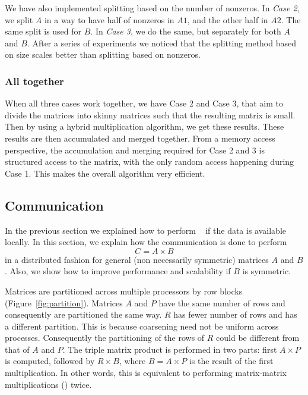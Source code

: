 We have also implemented splitting based on the number of nonzeros. In \textit{Case 2}, we split $A$ in a way to have half of nonzeros in $A1$, and the other half in $A2$. The same split is used for $B$. In \textit{Case 3}, we do the same, but separately for both $A$ and $B$. After a series of experiments we noticed that the splitting method based on size scales better than splitting based on nonzeros.

\subsubsection{All together}

When all three cases work together, we have Case 2 and Case 3, that aim to divide the matrices into skinny matrices such that the resulting matrix is small. Then by using a hybrid multiplication algorithm, we get these results. These results are then accumulated and merged together. From a memory access perspective, the accumulation and merging required for Case 2 and 3 is structured access to the matrix, with the only random access happening during Case 1. This makes the overall algorithm very efficient. 

\subsection{Communication}
\label{sec:amg}

In the previous section we explained how to perform \mm~ if the data is available locally. In this section, we explain how the communication is done to perform
\begin{equation}
    C = A \times B
\end{equation}
in a distributed fashion for general (non necessarily symmetric) matrices $A$ and $B$. Also, we show how to improve performance and scalability if $B$ is symmetric.

Matrices are partitioned across multiple processors by row blocks (Figure~\ref{fig:partition}). Matrices $A$ and $P$ have the same number of rows and consequently are partitioned the same way. $R$ has fewer number of rows and has a different partition. This is because coarsening need not be uniform across processes. Consequently the partitioning of the rows of $R$ could be different from that of $A$ and $P$. The triple matrix product is performed in two parts: first $A \times P$ is computed, followed by $R \times B$, where $B = A \times P$ is the result of the first multiplication. In other words, this is equivalent to performing matrix-matrix multiplications (\mm) twice.


